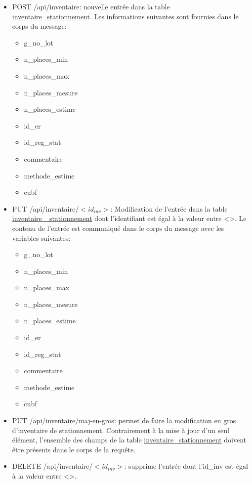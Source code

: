 \begin{itemize}
\begin{itemize}
        \item commentaire
        \item methode\_estime
        \item cubf
    \end{itemize}
     \item POST /api/inventaire: nouvelle entrée dans la table \underline{inventaire\_stationnement}. Les informations suivantes sont fournies dans le corps du message:
    \begin{itemize}
        \item g\_no\_lot
        \item n\_places\_min
        \item n\_places\_max
        \item n\_places\_mesure
        \item n\_places\_estime
        \item id\_er
        \item id\_reg\_stat
        \item commentaire
        \item methode\_estime
        \item cubf
    \end{itemize}
    \item PUT /api/inventaire/$<id_{inv}>$: Modification de l'entrée dans la table \ul{inventaire\_ stationnement} dont l'identifiant est égal à la valeur entre <>. Le contenu de l'entrée est communiqué dans le corps du message avec les variables suivantes:
    \begin{itemize}
        \item g\_no\_lot
        \item n\_places\_min
        \item n\_places\_max
        \item n\_places\_mesure
        \item n\_places\_estime
        \item id\_er
        \item id\_reg\_stat
        \item commentaire
        \item methode\_estime
        \item cubf
    \end{itemize}
    \item PUT /api/inventaire/maj-en-gros: permet de faire la modification en gros d'inventaire de stationnement. Contrairement à la mise à jour d'un seul élément, l'ensemble des champs de la table \ul{inventaire\_stationnement} doivent être présents dans le corps de la requête.
   
    
    \item DELETE /api/inventaire/$<id_{inv}>$: supprime l'entrée dont l'id\_inv est égal à la valeur entre <>.
\end{itemize}
